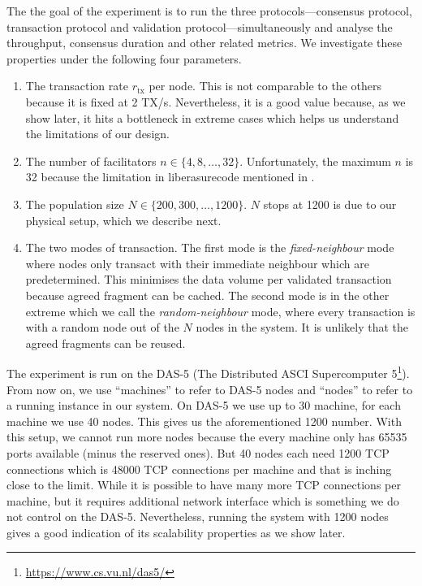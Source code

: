 The the goal of the experiment is to run the three protocols---consensus protocol,
transaction protocol and validation protocol---simultaneously and analyse the throughput, consensus duration and other related metrics.
We investigate these properties under the following four parameters.
\begin{enumerate}
  \item The transaction rate $r_{\text{tx}}$ per node. This is not comparable to the others because it is fixed at 2 TX/s.
        Nevertheless, it is a good value because, as we show later,
        it hits a bottleneck in extreme cases which helps us understand the limitations of our design.
  \item The number of facilitators $n \in \{4, 8, \dots, 32\}$.
        Unfortunately, the maximum $n$ is 32 because the limitation in liberasurecode mentioned in .
  \item The population size $N \in \{200, 300, \dots, 1200\}$.
        $N$ stops at 1200 is due to our physical setup, which we describe next.
  \item The two modes of transaction.
        The first mode is the \emph{fixed-neighbour} mode where nodes only transact with their immediate neighbour which are predetermined. 
        This minimises the data volume per validated transaction because agreed fragment can be cached.
        The second mode is in the other extreme which we call the \emph{random-neighbour} mode,
        where every transaction is with a random node out of the $N$ nodes in the system.
        It is unlikely that the agreed fragments can be reused.
\end{enumerate}

The experiment is run on the DAS-5 (The Distributed ASCI Supercomputer 5\footnote{\url{https://www.cs.vu.nl/das5/}}).
From now on, we use ``machines'' to refer to DAS-5 nodes and ``nodes'' to refer to a running instance in our system.
On DAS-5 we use up to 30 machine, for each machine we use 40 nodes.
This gives us the aforementioned 1200 number.
With this setup, we cannot run more nodes because the every machine only has 65535 ports available (minus the reserved ones).
But 40 nodes each need 1200 TCP connections which is 48000 TCP connections per machine and that is inching close to the limit.
While it is possible to have many more TCP connections per machine,
but it requires additional network interface which is something we do not control on the DAS-5.
Nevertheless, running the system with 1200 nodes gives a good indication of its scalability properties as we show later.

